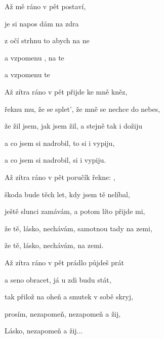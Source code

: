 

\zs
Až mě  ráno v pět
 postaví,

je si napos
dám  na zdra

z očí  {strhnu} 
to abych  na ne

a  vzpomenu 
, na te
   

a  vzpomenu  te
\ks

\zs
Až zítra ráno v pět přijde ke mně kněz,

řeknu mu, že se splet', že mně se nechce do nebes,

že žil jsem, jak jsem žil, a stejně tak i dožiju

a co jsem si nadrobil, to si i vypiju,

a co jsem si nadrobil, si i vypiju.
\ks

\zs
Až zítra ráno v pět poručík řekne: ,

škoda bude těch let, kdy jsem tě nelíbal,

ještě slunci zamávám, a potom líto přijde mi,

že tě, lásko, nechávám, samotnou tady na zemi,

že tě, lásko, nechávám, na zemi.
\ks

\zs
Až zítra ráno v pět prádlo půjdeš prát

a seno obracet, já u zdi budu stát,

tak přilož na oheň a smutek v sobě skryj,

prosím, nezapomeň, nezapomeň a žij,

Lásko, nezapomeň a žij...
\ks

\kp
























